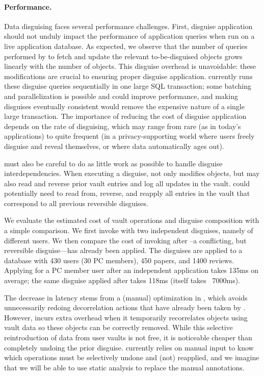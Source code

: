 \paragraph{Performance.}
\label{sec:perf}

Data disguising faces several performance challenges.
%
First, disguise application should not unduly impact the performance of application queries
when run on a live application database.
As expected, we observe that the number of queries performed by \sys to fetch and update the relevant
to-be-disguised objects grows linearly with the number of objects. This disguise overhead is
unavoidable: these modifications are crucial to ensuring proper disguise application.
\sys currently runs these disguise queries sequentially in one large SQL transaction; some batching
and parallelization is possible and could improve performance, and
making disguises eventually consistent would remove the expensive nature of a single large
transaction. The importance of reducing the cost of disguise application depends on the rate of
disguising, which may range from rare (as in today's applications) to quite frequent (in a
privacy-supporting world where users freely disguise and reveal themselves, or where data
automatically ages out).

%
\sys must also be careful to do as little work as possible to handle disguise interdependencies.
When executing a disguise, \sys not only modifies objects, but may also read and reverse prior
vault entries and log all updates in the vault.
%
\sys could potentially need to read from, reverse, and reapply all entries in the vault that correspond
to all previous reversible disguises.

We evaluate the estimated cost of vault operations and disguise composition with a simple
comparison. We first invoke \sys with two independent disguises, namely \hrtbf of different
users. We then compare the cost of invoking \hrtbf after \hconfanon--a conflicting, but reversible
disguise---has already been applied.
The disguises are applied to a database with 430 users (30 PC members), 450 papers, and 1400
reviews.
Applying \hrtbf for a PC member user after an independent \hrtbf application takes 135ms on average;
the same \hrtbf disguise applied after \hconfanon takes 118ms (\hconfanon itself takes
   ~7000ms). 

The decrease in latency stems from a (manual) optimization in \sys, which avoids unnecessarily
redoing decorrelation actions that have already been taken by \hconfanon.  However, \sys incurs
extra overhead when it temporarily recorrelates objects using vault data so these objects can be
correctly removed. While this selective reintroduction of data from user vaults is not free, it
is noticeable cheaper than completely undoing the prior \hconfanon disguise.
\sys currently relies on manual input to know which operations must be selectively undone and (not)
reapplied, and we imagine that we will be able to use static analysis to replace the manual
annotations.
